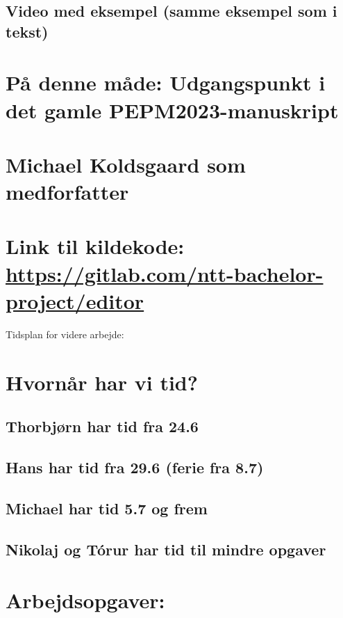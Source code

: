 \documentclass[11pt]{article}
\begin{document}
\subsection{Video med eksempel (samme eksempel som i tekst)}
\label{sec-3-7}

\section{På denne måde: Udgangspunkt i det gamle PEPM2023-manuskript}
\label{sec-4}

\section{Michael Koldsgaard som medforfatter}
\label{sec-5}

\section{Link til kildekode: \url{https://gitlab.com/ntt-bachelor-project/editor}}
\label{sec-6}

Tidsplan for videre arbejde:

\section{Hvornår har vi tid?}
\label{sec-7}

\subsection{Thorbjørn har tid fra 24.6}
\label{sec-7-1}
\subsection{Hans har tid fra 29.6 (ferie fra 8.7)}
\label{sec-7-2}
\subsection{Michael har tid 5.7 og frem}
\label{sec-7-3}
\subsection{Nikolaj og Tórur har tid til mindre opgaver}
\label{sec-7-4}

\section{Arbejdsopgaver:}
\label{sec-8}
\end{document}
